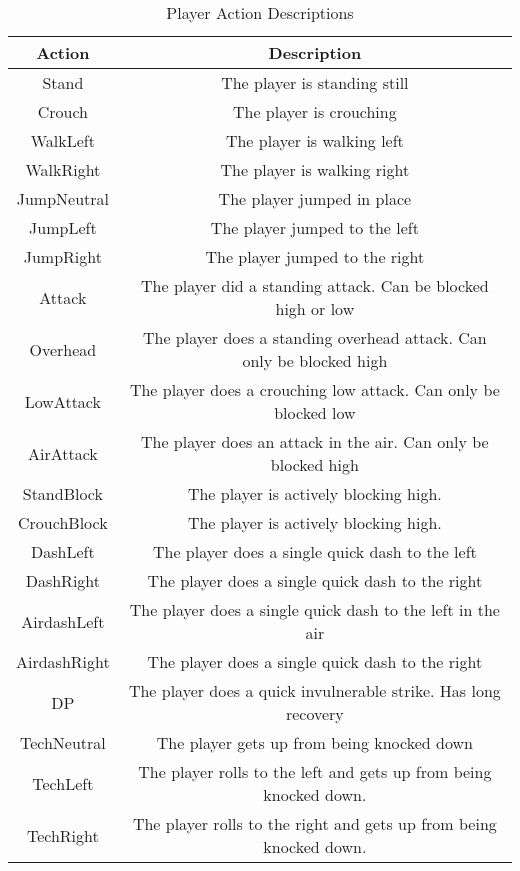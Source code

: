\begin{table}[h]
	\centering
	\caption{Player Action Descriptions}
	\begin{tabular}{| c | c |}
		\hline
		Action & Description \\
		\hline
		Stand & The player is standing still \\ 
		\hline
		Crouch & The player is crouching \\ 
		\hline
		WalkLeft & The player is walking left \\ 
		\hline
		WalkRight & The player is walking right \\
		\hline
		JumpNeutral & The player jumped in place \\
		\hline
		JumpLeft & The player jumped to the left\\
		\hline
		JumpRight & The player jumped to the right \\
		\hline
		Attack & The player did a standing attack. Can be blocked high or low \\
		\hline
		Overhead & The player does a standing overhead attack. Can only be blocked high \\ 
		\hline
		LowAttack & The player does a crouching low attack. Can only be blocked low \\ 
		\hline
		AirAttack & The player does an attack in the air. Can only be blocked high \\ 
		\hline
		StandBlock & The player is actively blocking high. \\ 
		\hline
		CrouchBlock & The player is actively blocking high. \\ 
		\hline
		DashLeft & The player does a single quick dash to the left \\ 
		\hline
		DashRight & The player does a single quick dash to the right \\ 
		\hline
		AirdashLeft & The player does a single quick dash to the left in the air \\ 
		\hline
		AirdashRight & The player does a single quick dash to the right \\ 
		\hline
		DP & The player does a quick invulnerable strike. Has long recovery \\
		\hline
		TechNeutral & The player gets up from being knocked down \\ 
		\hline
		TechLeft & The player rolls to the left and gets up from being knocked down. \\ 
		\hline
		TechRight & The player rolls to the right and gets up from being knocked down. \\ 
		\hline
	\end{tabular}
	\label{actions}
\end{table}